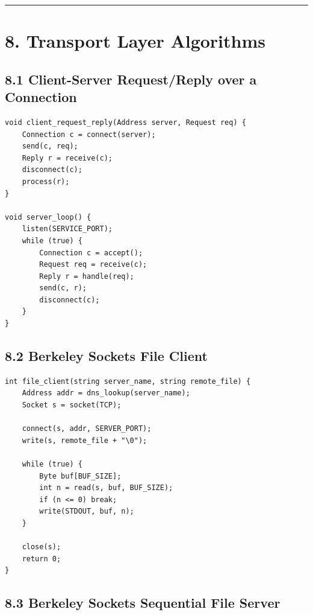 \documentclass[11pt]{article}
\begin{document}
\begin{center}\rule{0.5\linewidth}{0.5pt}\end{center}

\section{8. Transport Layer
Algorithms}\label{transport-layer-algorithms}

\subsection{8.1 Client-Server Request/Reply over a
Connection}\label{client-server-requestreply-over-a-connection}

\begin{verbatim}
void client_request_reply(Address server, Request req) {
    Connection c = connect(server);
    send(c, req);
    Reply r = receive(c);
    disconnect(c);
    process(r);
}

void server_loop() {
    listen(SERVICE_PORT);
    while (true) {
        Connection c = accept();
        Request req = receive(c);
        Reply r = handle(req);
        send(c, r);
        disconnect(c);
    }
}
\end{verbatim}

\subsection{8.2 Berkeley Sockets File
Client}\label{berkeley-sockets-file-client}

\begin{verbatim}
int file_client(string server_name, string remote_file) {
    Address addr = dns_lookup(server_name);
    Socket s = socket(TCP);

    connect(s, addr, SERVER_PORT);
    write(s, remote_file + "\0");

    while (true) {
        Byte buf[BUF_SIZE];
        int n = read(s, buf, BUF_SIZE);
        if (n <= 0) break;
        write(STDOUT, buf, n);
    }

    close(s);
    return 0;
}
\end{verbatim}

\subsection{8.3 Berkeley Sockets Sequential File
Server}\label{berkeley-sockets-sequential-file-server}
\end{document}
